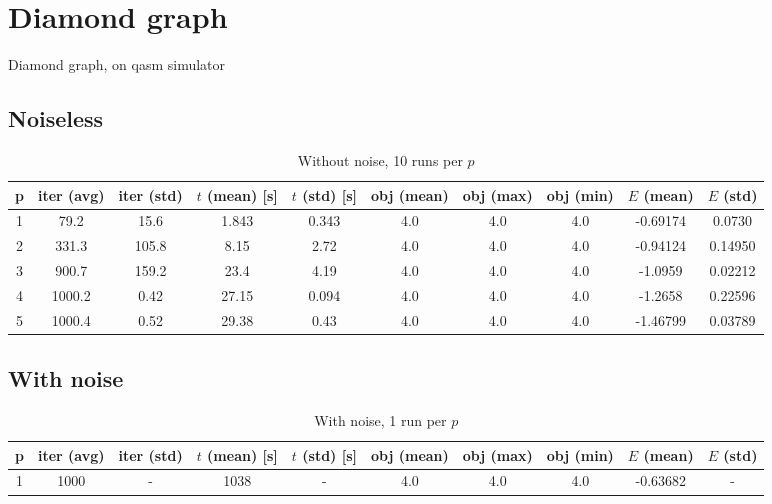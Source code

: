 \documentclass{beamer}
\begin{document}
\section{Diamond graph}
\begin{frame}{Diamond graph, on qasm simulator}
\subsection{Noiseless}
\begin{table}
	\begin{center}
		\begin{adjustbox}{width=\textwidth}
			\begin{tabular}{||c c c c c c c c c c||} 
				\hline
				p & iter (avg) & iter (std) & $t$ (mean) [s] & $t$ (std) [s] & obj (mean) & obj (max) & obj (min) & $E$ (mean) & $E$ (std) \\ [0.5ex] 
				\hline\hline
				1 & 79.2 & 15.6 & 1.843 & 0.343 & 4.0 & 4.0 & 4.0 & -0.69174 & 0.0730\\ 
				\hline
				2 & 331.3 & 105.8 & 8.15 & 2.72  & 4.0 & 4.0 & 4.0 & -0.94124 & 0.14950 \\
				\hline
				3 & 900.7 & 159.2 & 23.4 & 4.19  & 4.0 & 4.0 & 4.0 & -1.0959 & 0.02212 \\
				\hline
				4 & 1000.2 & 0.42 & 27.15 & 0.094  & 4.0 & 4.0 & 4.0 & -1.2658 & 0.22596 \\
				\hline
				5 & 1000.4 & 0.52 & 29.38 & 0.43  & 4.0 & 4.0 & 4.0 & -1.46799 & 0.03789 \\ [1ex] 
				\hline
			\end{tabular}
		\end{adjustbox}
	\end{center}
	\caption{Without noise, 10 runs per $p$}
\end{table}

\subsection{With noise}
\begin{table}
	\begin{center}
		\begin{adjustbox}{width=\textwidth}
			\begin{tabular}{||c c c c c c c c c c||} 
				\hline
				p & iter (avg) & iter (std) & $t$ (mean) [s] & $t$ (std) [s] & obj (mean) & obj (max) & obj (min) & $E$ (mean) & $E$ (std) \\ [0.5ex] 
				\hline\hline
				1 & 1000 & - & 1038 & - & 4.0 & 4.0 & 4.0 & -0.63682 & -\\ 
				[1ex] 
				\hline
			\end{tabular}
		\end{adjustbox}
	\end{center}
	\caption{With noise, 1 run per $p$}
\end{table}
\end{frame}
\end{document}
